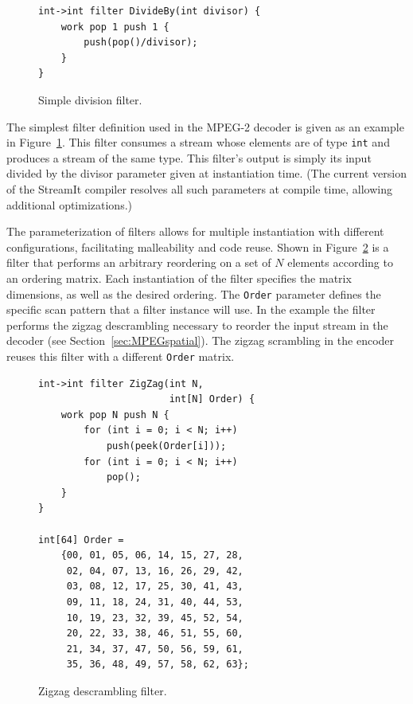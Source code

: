 \begin{figure}[h]
  \begin{center}
    \begin{minipage}{3in}
      \begin{small}
        \begin{verbatim}
int->int filter DivideBy(int divisor) {
    work pop 1 push 1 {
        push(pop()/divisor);
    }
}
        \end{verbatim}
      \end{small}
    \end{minipage}
  \end{center}
  \caption{Simple division filter.}
  \label{fig:divide}
\end{figure}

The simplest filter definition used in the MPEG-2 decoder
is given as an example in 
Figure~\ref{fig:divide}. This filter consumes a stream whose elements 
are of type {\tt int} and produces a stream of the same type.
This filter's output is simply its input divided by the divisor parameter
given at instantiation time. (The current version of the StreamIt compiler 
resolves all such parameters at compile time, allowing additional 
optimizations.)

The parameterization of filters allows for multiple instantiation
with different configurations, facilitating malleability and code reuse.
Shown in Figure~\ref{fig:zigzag-filter} is a filter that 
performs an arbitrary reordering on a set of $N$ elements
according to an ordering matrix. Each instantiation of the filter specifies the
matrix dimensions, as well as the desired ordering. The {\tt Order} parameter defines the
specific scan pattern that a filter instance will use.
In the example the filter performs the zigzag descrambling necessary to 
reorder the input stream in the decoder (see Section~\ref{sec:MPEGspatial}). 
The zigzag scrambling in the encoder
reuses this filter with a different {\tt Order} matrix.

\begin{figure}
  \begin{center}
    \begin{minipage}{3in}
      \begin{small}
        \begin{verbatim}
int->int filter ZigZag(int N, 
                       int[N] Order) {
    work pop N push N {
        for (int i = 0; i < N; i++)
            push(peek(Order[i]));
        for (int i = 0; i < N; i++)
            pop();
    }
}

int[64] Order =
    {00, 01, 05, 06, 14, 15, 27, 28,
     02, 04, 07, 13, 16, 26, 29, 42,
     03, 08, 12, 17, 25, 30, 41, 43,
     09, 11, 18, 24, 31, 40, 44, 53,
     10, 19, 23, 32, 39, 45, 52, 54,
     20, 22, 33, 38, 46, 51, 55, 60,
     21, 34, 37, 47, 50, 56, 59, 61,
     35, 36, 48, 49, 57, 58, 62, 63};
        \end{verbatim}
      \end{small}
    \end{minipage}
  \end{center}
  \caption{Zigzag descrambling filter.}
  \label{fig:zigzag-filter}
\end{figure}


